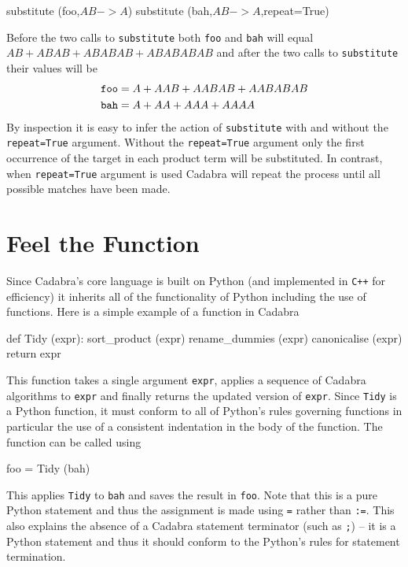 \documentclass[a4paper,12pt]{article}
\numberwithin{equation}{section}%
\begin{document}
\begin{Exercises}
\begin{Exercise}
\begin{cadabra}
         substitute (foo,$A B -> A$)
         substitute (bah,$A B -> A$,repeat=True)
      \end{cadabra}
      Before the two calls to \verb|substitute| both \verb|foo| and \verb|bah| will equal
      $A B + A B A B + A B A B A B + A B A B A B A B$ and after the two calls to
      \verb|substitute| their values will be
      \begin{align*}
         {\tt foo} &= A + A A B + A A B A B + A A B A B A B\\
         {\tt bah} &= A + A A + A A A + A A A A
      \end{align*}
      By inspection it is easy to infer the action of \verb|substitute| with and without the
      \verb|repeat=True| argument. Without the \verb|repeat=True| argument only the first
      occurrence of the target in each product term will be substituted. In contrast, when
      \verb|repeat=True| argument is used Cadabra will repeat the process until all possible
      matches have been made.
   \end{Exercise}

\end{Exercises}

\clearpage

\section{Feel the Function}
\label{sec:ex-04}
\setcounter{ExerciseNum}{0}



Since Cadabra's core language is built on Python (and implemented in \verb|C++| for
efficiency) it inherits all of the functionality of Python including the use of functions.
Here is a simple example of a function in Cadabra
\begin{cadabra}
   def Tidy (expr):
      sort_product   (expr)
      rename_dummies (expr)
      canonicalise   (expr)
      return expr
\end{cadabra}
This function takes a single argument \verb|expr|, applies a sequence of Cadabra algorithms
to \verb|expr| and finally returns the updated version of \verb|expr|. Since \verb|Tidy| is
a Python function, it must conform to all of Python's rules governing functions in
particular the use of a consistent indentation in the body of the function. The function can
be called using
\begin{cadabra}[numbers=none]
   foo = Tidy (bah)
\end{cadabra}
This applies \verb|Tidy| to \verb|bah| and saves the result in \verb|foo|. Note that this is
a pure Python statement and thus the assignment is made using \verb|=| rather than
\verb|:=|. This also explains the absence of a Cadabra statement terminator (such as
\verb|;|) -- it is a Python statement and thus it should conform to the Python's rules for
statement termination.
\end{document}
